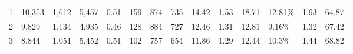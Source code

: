 \documentclass[11pt,a4paper]{article}
\begin{document}
\begin{table*}[h]
{\begin{tabular}{l|llll|llllllll|l}
1               & 10,353                                                             & 1,612                                                                & 5,457                                                                 & 0.51                                                               & 159              & 874                   & 735                                                                            & 14.42                                                                              & 1.53                                                                              & 18.71                                                                               & 12.81\%                                                                                   & 1.93                                                                                      & 64.87                                                                                 \\
2               & 9,829                                                              & 1,134                                                                & 4,935                                                                 & 0.46                                                               & 128              & 884                   & 727                                                                            & 12.46                                                                              & 1.31                                                                              & 12.81                                                                               & 9.16\%                                                                                    & 1.32                                                                                      & 67.42                                                                                 \\
3               & 8,844                                                              & 1,051                                                                & 5,452                                                                 & 0.51                                                               & 102              & 757                   & 654                                                                            & 11.86                                                                              & 1.29                                                                              & 12.44                                                                               & 10.3\%                                                                                    & 1.44                                                                                      & 68.82                                                                                 \\ \hline

\end{tabular}}
\end{table*}
\end{document}
